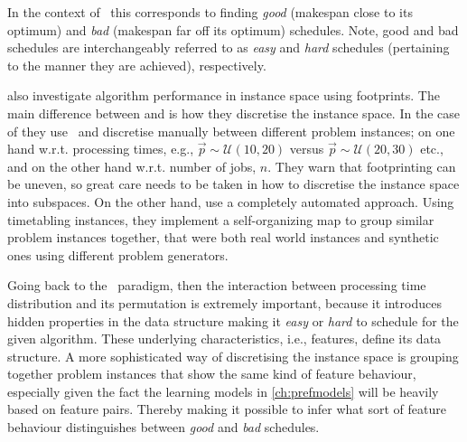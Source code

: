 In the context of \jsp\ this corresponds to finding \emph{good} (makespan close to its optimum)  and \emph{bad} (makespan far off its optimum) schedules. Note, good and bad schedules are interchangeably referred to as \emph{easy} and \emph{hard} schedules (pertaining to the manner they are achieved), respectively. 

\citet{SmithMilesLion5} also investigate algorithm performance in instance space using footprints. The main difference between \citeauthor{Corne10} and \citeauthor{SmithMilesLion5} is how they discretise the instance space. In the case of \citeauthor{Corne10} they use \jsp\ and discretise manually between different problem instances; on one hand w.r.t. processing times, e.g.,  $\vec{p}\sim \mathcal{U}(10,20)$ versus $\vec{p}\sim \mathcal{U}(20,30)$ etc., and on the other hand w.r.t. number of jobs, $n$. 
They warn that footprinting can be uneven, so great care needs to be taken in how to discretise the instance space into subspaces. 
On the other hand, \citeauthor{SmithMilesLion5} use a completely automated approach. Using timetabling instances, they implement a self-organizing map to group similar problem instances together, that were both real world instances and synthetic ones using different problem generators. 

Going back to the \jsp\ paradigm, then the interaction between processing time distribution and its permutation is extremely important, because it introduces hidden properties in the data structure making it \emph{easy} or \emph{hard} to schedule for the given algorithm. These underlying characteristics, i.e., features, define its data structure. A more sophisticated way of discretising the instance space is grouping together problem instances that show the same kind of feature behaviour, especially given the fact the learning models in \cref{ch:prefmodels} will be heavily based on feature pairs. Thereby making it possible to infer what sort of feature behaviour distinguishes  between \emph{good} and \emph{bad} schedules. 

